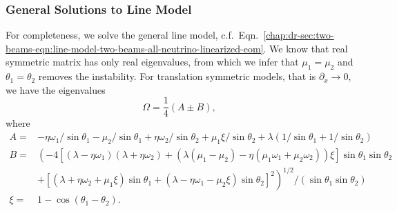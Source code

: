 




\subsubsection{General Solutions to Line Model}


For completeness, we solve the general line model, c.f.~Eqn.~\ref{chap:dr-sec:two-beams-eqn:line-model-two-beams-all-neutrino-linearized-eom}. We know that real symmetric matrix has only real eigenvalues, from which we infer that $\mu_1=\mu_2$ and $\theta_1=\theta_2$ removes the instability.
For translation symmetric models, that is $\partial_x\to 0$, we have the eigenvalues
\begin{equation*}
   \Omega = \frac{1}{4}(A\pm B),
\end{equation*}
where
\begin{align*}
   A=& -\eta \omega_1/\sin\theta_1 - \mu_2 /\sin\theta_1 + \eta \omega_2 /\sin\theta_2 + \mu_1 \xi /\sin\theta_2 + \lambda(1/\sin\theta_1 + 1/\sin\theta_2)  \\
   B=& \left(
      -4[(\lambda-\eta\omega_1)(\lambda +\eta\omega_2) + (\lambda (\mu_1-\mu_2) -\eta (\mu_1\omega_1 + \mu_2\omega_2) )\xi ] \sin\theta_1 \sin\theta_2\right. \\
      &\left.+ [(\lambda + \eta\omega_2 + \mu_1\xi) \sin\theta_1 + (\lambda - \eta \omega_1 - \mu_2\xi) \sin\theta_2 ]^2
   \right)^{1/2}/(\sin\theta_1\sin\theta_2)\\
   \xi=&1-\cos(\theta_1-\theta_2).
\end{align*}


